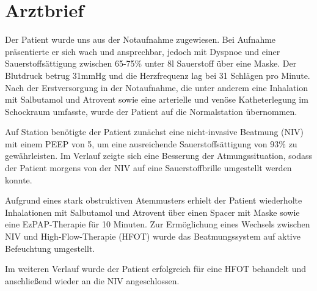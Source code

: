 \documentclass{article}%
\begin{document}
%
\normalsize%
\section{Arztbrief}%
\label{sec:Arztbrief}%
Der Patient wurde uns aus der Notaufnahme zugewiesen. Bei Aufnahme präsentierte er sich wach und ansprechbar, jedoch mit Dyspnoe und einer Sauerstoffsättigung zwischen 65{-}75\% unter 8l Sauerstoff über eine Maske. Der Blutdruck betrug 31mmHg und die Herzfrequenz lag bei 31 Schlägen pro Minute. Nach der Erstversorgung in der Notaufnahme, die unter anderem eine Inhalation mit Salbutamol und Atrovent sowie eine arterielle und venöse Katheterlegung im Schockraum umfasste, wurde der Patient auf die Normalstation übernommen. 
\newline%

\newline%
Auf Station benötigte der Patient zunächst eine nicht{-}invasive Beatmung (NIV) mit einem PEEP von 5, um eine ausreichende Sauerstoffsättigung von 93\% zu gewährleisten. Im Verlauf zeigte sich eine Besserung der Atmungssituation, sodass der Patient morgens von der NIV auf eine Sauerstoffbrille umgestellt werden konnte. 
\newline%

\newline%
Aufgrund eines stark obstruktiven Atemmusters erhielt der Patient wiederholte Inhalationen mit Salbutamol und Atrovent über einen Spacer mit Maske sowie eine EzPAP{-}Therapie für 10 Minuten. Zur Ermöglichung eines Wechsels zwischen NIV und High{-}Flow{-}Therapie (HFOT) wurde das Beatmungssystem auf aktive Befeuchtung umgestellt. 
\newline%

\newline%
Im weiteren Verlauf wurde der Patient erfolgreich für eine HFOT behandelt und anschließend wieder an die NIV angeschlossen. 
\newline%

%
\end{document}
